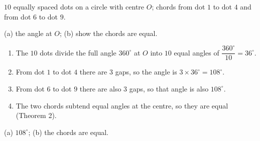 \begin{answerblock}
\begin{minipage}[t]{0.66\linewidth}\vspace{0pt}
\Given $10$ equally spaced dots on a circle with centre $O$; chords from dot $1$ to dot $4$ and from dot $6$ to dot $9$.

\Tofind (a) the angle at $O$; (b) show the chords are equal.

\begin{enumerate}[label=\arabic*.,leftmargin=1.6em,itemsep=0pt,topsep=2pt]
\item The $10$ dots divide the full angle $360^\circ$ at $O$ into $10$ equal angles of $\dfrac{360^\circ}{10}=36^\circ$.
\item From dot $1$ to dot $4$ there are $3$ gaps, so the angle is $3\times36^\circ=108^\circ$.
\item From dot $6$ to dot $9$ there are also $3$ gaps, so that angle is also $108^\circ$.
\item The two chords subtend equal angles at the centre, so they are equal (Theorem 2).
\end{enumerate}
\Ans (a) $108^\circ$; (b) the chords are equal.
\end{minipage}\hfill
\begin{minipage}[t]{0.3\linewidth}\vspace{0pt}
\centering
{}
\end{minipage}
\end{answerblock}


